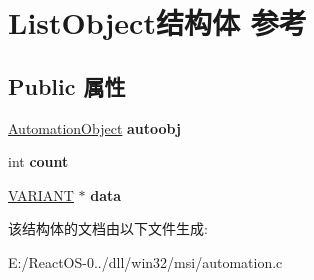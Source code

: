\hypertarget{struct_list_object}{}\section{List\+Object结构体 参考}
\label{struct_list_object}
\subsection*{Public 属性}
\begin{DoxyCompactItemize}
\item 
\mbox{\label{struct_list_object_a16da1833f4064e12b720cdd1050f8f3b}} 
\hyperlink{struct_automation_object}{Automation\+Object} {\bfseries autoobj}
\item 
\mbox{\label{struct_list_object_a9a1ea2ee11276ed0b7185a71c71b52be}} 
int {\bfseries count}
\item 
\mbox{\label{struct_list_object_afa5103ee4e00b8b0327d44dae0d1a079}} 
\hyperlink{structtag_v_a_r_i_a_n_t}{V\+A\+R\+I\+A\+NT} $\ast$ {\bfseries data}
\end{DoxyCompactItemize}


该结构体的文档由以下文件生成\+:\begin{DoxyCompactItemize}
\item 
E\+:/\+React\+O\+S-\/0../dll/win32/msi/automation.\+c\end{DoxyCompactItemize}
